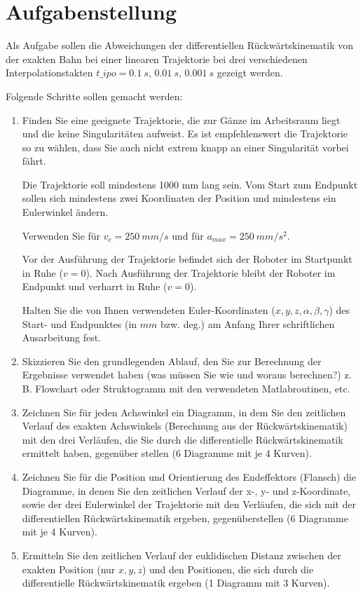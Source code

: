 \documentclass[./\jobname.tex]{subfiles}
\begin{document}
%
\chapter{Aufgabenstellung}
%
Als Aufgabe sollen die Abweichungen der differentiellen Rückwärtskinematik von der exakten Bahn bei einer linearen Trajektorie bei drei verschiedenen Interpolationstakten \(t\_ipo = 0.1~s, \,0.01~s,\, 0.001~s\) gezeigt werden.\par
%
Folgende Schritte sollen gemacht werden:
\begin{enumerate}
\item Finden Sie eine geeignete Trajektorie, die zur Gänze im Arbeitsraum liegt und die keine Singularitäten aufweist. Es ist empfehlenswert die Trajektorie so zu wählen, dass Sie auch nicht extrem knapp an einer Singularität vorbei fährt.\par
Die Trajektorie soll mindestens 1000 mm lang sein. Vom Start zum Endpunkt sollen sich mindestens zwei Koordinaten der Position und mindestens ein Eulerwinkel ändern.\par
Verwenden Sie für \(v_{c} = 250~mm/s\) und für \(a_{max} = 250~mm/s^{2}\).\par
Vor der Ausführung der Trajektorie befindet sich der Roboter im Startpunkt in Ruhe (\(v = 0\)). Nach Ausführung der Trajektorie bleibt der Roboter im Endpunkt und verharrt in Ruhe (\(v = 0\)).\par
Halten Sie die von Ihnen verwendeten Euler-Koordinaten (\(x,y,z,\alpha,\beta,\gamma\)) des Start- und Endpunktes (in \(mm\) bzw. deg.) am Anfang Ihrer schriftlichen Ausarbeitung fest.
\item Skizzieren Sie den grundlegenden Ablauf, den Sie zur Berechnung der Ergebnisse verwendet haben (was müssen Sie wie und woraus berechnen?)
z. B. Flowchart oder Struktogramm mit den verwendeten Matlabroutinen, etc.
\item Zeichnen Sie für jeden Achswinkel ein Diagramm, in dem Sie den zeitlichen Verlauf des exakten Achswinkels (Berechnung aus der Rückwärtskinematik) mit den drei Verläufen, die Sie durch die differentielle Rückwärtskinematik ermittelt haben, gegenüber stellen (6 Diagramme mit je 4 Kurven).
\item Zeichnen Sie für die Position und Orientierung des Endeffektors (Flansch) die Diagramme, in denen Sie den zeitlichen Verlauf der x-, y- und z-Koordinate, sowie der drei Eulerwinkel der Trajektorie mit den Verläufen, die sich mit der differentiellen Rückwärtskinematik ergeben, gegenüberstellen (6 Diagramme mit je 4 Kurven).
\item Ermitteln Sie den zeitlichen Verlauf der euklidischen Distanz zwischen der exakten Position (nur \(x,y,z\)) und den Positionen, die sich durch die differentielle Rückwärtskinematik ergeben (1 Diagramm mit 3 Kurven).
\end{enumerate}
\end{document}
